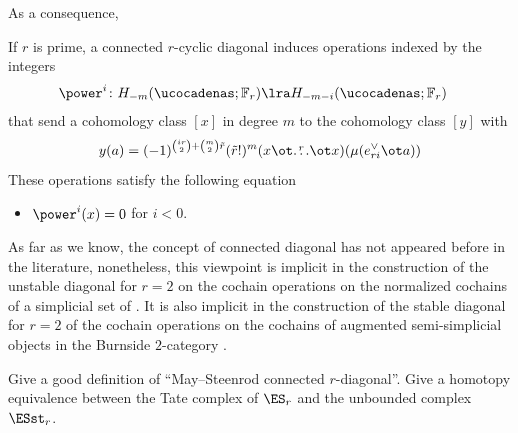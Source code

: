 As a consequence,

\begin{proposition}
	If $r$ is prime, a connected $r$-cyclic diagonal induces operations indexed by the integers
	\begin{align*}
		\power^{i} \colon H_{-m}(\ucocadenas;\mathbb{F}_r)& \lra H_{-m-i}(\ucocadenas;\mathbb{F}_r)
	\end{align*}
	that send a cohomology class $[x]$ in degree $m$ to the cohomology class $[y]$ with
	\[
	y(a) = (-1)^{\binom{ir}{2} + \binom{m}{2}\tilde{r}}(\tilde{r}!)^m(x \ot \overset{r}{\dots} \ot x)(\mu(e_{ri}^\vee \ot a))
	\]
	These operations satisfy the following equation
	\begin{itemize}
		\item $\power^i(x) = 0$ for $i<0$.
	\end{itemize}
\end{proposition}

\begin{example}
	As far as we know, the concept of connected diagonal has not appeared before in the literature, nonetheless, this viewpoint is implicit in the construction of the unstable diagonal for $r=2$ on the cochain operations on the normalized cochains of a simplicial set of \cite{medina2021fast_sq}.
	It is also implicit in the construction of the stable diagonal for $r=2$ of the cochain operations on the cochains of augmented semi-simplicial objects in the Burnside $2$-category \cite{cantero-moran2020khovanov}.
\end{example}

\begin{question}
	Give a good definition of ``May--Steenrod connected $r$-diagonal''.
	Give a homotopy equivalence between the Tate complex of $\ES_r$ and the unbounded complex $\ESst_r$.
\end{question}

